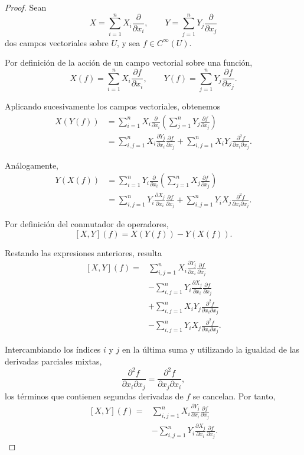 \documentclass[11pt,a4paper]{article}
\theoremstyle{definition}
\theoremstyle{plain}
\theoremstyle{remark}
\begin{document}
	\begin{proof}
		Sean
		\[
		X=\sum_{i=1}^{n}X_i\frac{\partial}{\partial x_i},
		\qquad
		Y=\sum_{j=1}^{n}Y_j\frac{\partial}{\partial x_j}
		\]
		dos campos vectoriales sobre $U$, y sea $f\in C^\infty(U)$.
		
		Por definición de la acción de un campo vectorial sobre una función,
		\[
		X(f)=\sum_{i=1}^{n}X_i\frac{\partial f}{\partial x_i},
		\qquad
		Y(f)=\sum_{j=1}^{n}Y_j\frac{\partial f}{\partial x_j}.
		\]
		
		Aplicando sucesivamente los campos vectoriales, obtenemos
		\[
		\begin{aligned}
			X(Y(f))
			&=\sum_{i=1}^{n}X_i
			\frac{\partial}{\partial x_i}
			\left(\sum_{j=1}^{n}Y_j
			\frac{\partial f}{\partial x_j}\right)\\
			&=\sum_{i,j=1}^{n}X_i
			\frac{\partial Y_j}{\partial x_i}
			\frac{\partial f}{\partial x_j}
			+\sum_{i,j=1}^{n}X_iY_j
			\frac{\partial^2 f}{\partial x_i\partial x_j}.
		\end{aligned}
		\]
		
		Análogamente,
		\[
		\begin{aligned}
			Y(X(f))
			&=\sum_{i=1}^{n}Y_i
			\frac{\partial}{\partial x_i}
			\left(\sum_{j=1}^{n}X_j
			\frac{\partial f}{\partial x_j}\right)\\
			&=\sum_{i,j=1}^{n}Y_i
			\frac{\partial X_j}{\partial x_i}
			\frac{\partial f}{\partial x_j}
			+\sum_{i,j=1}^{n}Y_iX_j
			\frac{\partial^2 f}{\partial x_i\partial x_j}.
		\end{aligned}
		\]
		
		Por definición del conmutador de operadores,
		\[
		[X,Y](f)=X(Y(f))-Y(X(f)).
		\]
		
		Restando las expresiones anteriores, resulta
		\[
		\begin{aligned}
			[X,Y](f)
			={}&\sum_{i,j=1}^{n}X_i
			\frac{\partial Y_j}{\partial x_i}
			\frac{\partial f}{\partial x_j}\\
			&-\sum_{i,j=1}^{n}Y_i
			\frac{\partial X_j}{\partial x_i}
			\frac{\partial f}{\partial x_j}\\
			&+\sum_{i,j=1}^{n}X_iY_j
			\frac{\partial^2 f}{\partial x_i\partial x_j}\\
			&-\sum_{i,j=1}^{n}Y_iX_j
			\frac{\partial^2 f}{\partial x_i\partial x_j}.
		\end{aligned}
		\]
		
		Intercambiando los índices $i$ y $j$ en la última suma y utilizando la igualdad de las derivadas parciales mixtas,
		\[
		\frac{\partial^2 f}{\partial x_i\partial x_j}
		=
		\frac{\partial^2 f}{\partial x_j\partial x_i},
		\]
		los términos que contienen segundas derivadas de $f$ se cancelan. Por tanto,
		\[
		\begin{aligned}
			[X,Y](f)
			={}&\sum_{i,j=1}^{n}X_i
			\frac{\partial Y_j}{\partial x_i}
			\frac{\partial f}{\partial x_j}\\
			&-\sum_{i,j=1}^{n}Y_i
			\frac{\partial X_j}{\partial x_i}
			\frac{\partial f}{\partial x_j}.
		\end{aligned}
		\]
		

\end{proof}
\end{document}
